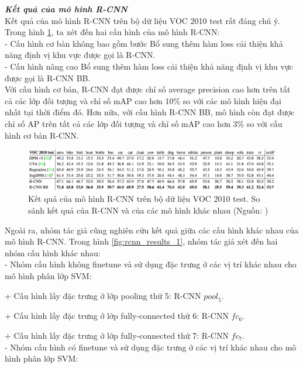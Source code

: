 {        \noindent
        \textbf{\textit{Kết quả của mô hình R-CNN}} \\
        Kết quả của mô hình R-CNN trên bộ dữ liệu VOC 2010 test rất đáng chú ý.
        Trong hình \ref{fig:rcnn_results_3}, ta xét đến hai cấu hình của mô hình R-CNN: \\
        - Cấu hình cơ bản không bao gồm bước Bổ sung thêm hàm loss cải thiện khả năng định vị khu vực được gọi là R-CNN. \\
        - Cấu hình nâng cao Bổ sung thêm hàm loss cải thiện khả năng định vị khu vực được gọi là R-CNN BB. \\
        Với cấu hình cơ bản, R-CNN đạt được chỉ số average precision cao hơn trên tất cả các lớp đối tượng và chỉ số mAP cao hơn 10\% so với các mô hình hiện đại nhất tại thời điểm đó.
        Hơn nữa, với cấu hình R-CNN BB, mô hình còn đạt được chỉ số AP trên tất cả các lớp đối tượng và chỉ số mAP cao hơn 3\% so với cấu hình cơ bản R-CNN.
        \begin{figure}[H]
            \centering
            \includegraphics[width=15cm] {images/rcnn_results_3}
            \caption{Kết quả của mô hình R-CNN trên bộ dữ liệu VOC 2010 test. So sánh kết quả của R-CNN và của các mô hình khác nhau (Nguồn: \cite{girshick2014rich})}
            \label{fig:rcnn_results_3}
        \end{figure}
        \noindent
        Ngoài ra, nhóm tác giả cũng nghiên cứu kết quả giữa các cấu hình khác nhau của mô hình R-CNN.
        Trong hình \ref{fig:rcnn_results_1}, nhóm tác giả xét đến hai nhóm cấu hình khác nhau: \\
        - Nhóm cấu hình không finetune và sử dụng đặc trưng ở các vị trí khác nhau cho mô hình phân lớp SVM: \par
        + Cấu hình lấy đặc trưng ở lớp pooling thứ 5: R-CNN ${pool}_{5}$. \par
        + Cấu hình lấy đặc trưng ở lớp fully-connected thứ 6: R-CNN ${fc}_{6}$. \par
        + Cấu hình lấy đặc trưng ở lớp fully-connected thứ 7: R-CNN ${fc}_{7}$. \\
        - Nhóm cấu hình có finetune và sử dụng đặc trưng ở các vị trí khác nhau cho mô hình phân lớp SVM: \par
}
